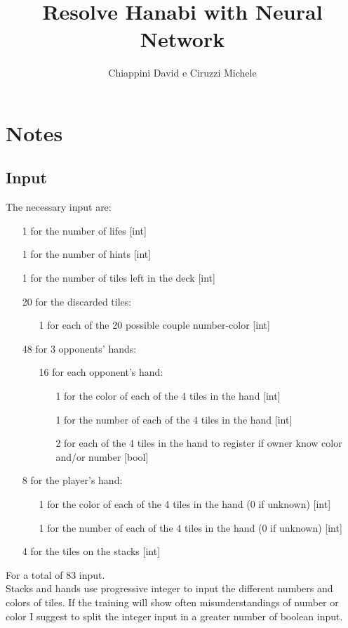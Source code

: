 \documentclass[]{article}
\title{Resolve Hanabi with Neural Network}
\author{Chiappini David e Ciruzzi Michele}
\begin{document}
\maketitle

\section{Notes}

\subsection{Input}
The necessary input are:
\begin{itemize}
	\item[1] for the number of lifes [int]
	\item[1] for the number of hints [int]
	\item[1] for the number of tiles left in the deck [int]
	\item[20] for the discarded tiles:
	\begin{itemize}
		\item[1] for each of the 20 possible couple number-color [int]
	\end{itemize}
	\item[48] for 3 opponents' hands:
	\begin{itemize}
		\item[16] for each opponent's hand:
		\begin{itemize}
			\item[1] for the color of each of the 4 tiles in the hand [int]
			\item[1] for the number of each of the 4 tiles in the hand [int]
			\item[2] for each of the 4 tiles in the hand to register if owner know color and/or number [bool]
		\end{itemize}
	\end{itemize}
	\item[8] for the player's hand:
	\begin{itemize}
		\item[1] for the color of each of the 4 tiles in the hand (0 if unknown) [int]
		\item[1] for the number of each of the 4 tiles in the hand (0 if unknown) [int]
	\end{itemize}
	\item[4] for the tiles on the stacks [int]
\end{itemize}
For a total of 83 input. \\
Stacks and hands use progressive integer to input the different numbers and colors of tiles. If the training will show often misunderstandings of number or color I suggest to split the integer input in a greater number of boolean input.
\end{document}
